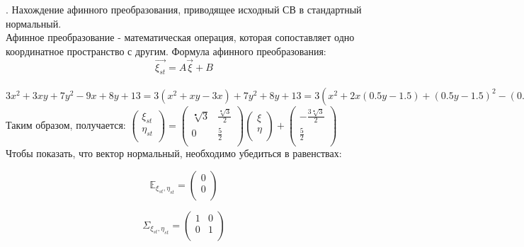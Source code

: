 \documentclass{article}
\begin{document}
. Нахождение афинного преобразования, приводящее исходный СВ в стандартный нормальный.\\

Афинное преобразование - математическая операция, которая сопоставляет одно координатное пространство с другим. Формула афинного преобразования:
$$ \vec{\xi_{st}}=A\vec{\xi}+B$$

$3x^2+3xy+7y^2-9x+8y+13 = 3(x^2+xy-3x)+7y^2+8y+13
=3(x^2+2x(0.5y-1.5)+(0.5y-1.5)^2-(0.5y-1.5)^2)+7y^2+8y+13
=3(x+0.5y-1.5)^2+7y^2+8y+13-\frac{3y^2}{4}+\frac{9y}{2}+\frac{27}{4}
=3(x+0.5y-1.5)^2+\frac{25y^2+(32+18)y+(13\cdot14-27)}{4}
=3(x+0.5y-1.5)^2+\frac{25y^2+50y+25}{4}
=3(x+0.5y-1.5)^2+\frac{25}{4}(y+1)^2=(\sqrt[•]{3}x+\frac{\sqrt[•]{3}}{2}y-\frac{3\sqrt[•]{3}}{2})^2+(\frac{5}{2}y+\frac{5}{2})^2$\\

Таким образом, получается:
$ 	\left(
  		{\begin{array}{c}
    			\xi_{st}\\
    			\eta_{st}\\
  		\end{array}}
  	\right)
  	=
  	\left(
  		{\begin{array}{cc}
    			\sqrt[•]{3} & \frac{\sqrt[•]{3}}{2}\\
    			0 & \frac{5}{2} \\
  		\end{array}}
  	\right)
  	\left(
  		{\begin{array}{c}
    			\xi\\
    			\eta\\
  		\end{array}}
  	\right)
  	+
  	\left(
  		{\begin{array}{c}
    			-\frac{3\sqrt[•]{3}}{2}\\
    			\frac{5}{2}\\
  		\end{array}}
  	\right)
$\\

Чтобы показать, что вектор нормальный, необходимо убедиться в равенствах:

$$\mathbb{E}_{\xi_{st},\eta_{st}}=
\left({
	\begin{array}{c}
  		0\\
  		0\\
  	\end{array} } 
\right)$$

$$\Sigma_{\xi_{st},\eta_{st}}=
\left(
	{\begin{array}{cc}
    1 & 0\\
    0 & 1\\
  \end{array}}
\right)$$
\end{document}
